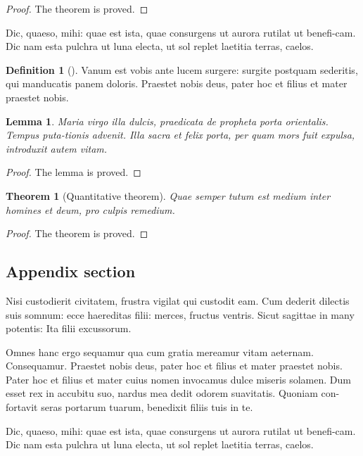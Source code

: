 \documentclass[numbers,compress]{vmsta2}
\newtheorem{thm}{Theorem}
\newtheorem{lemma}{Lemma}
\theoremstyle{definition}
\newtheorem{defin}{Definition}
\begin{document}
\begin{proof}
The theorem is proved.
\end{proof}

Dic, quaeso, mihi: quae est ista, quae consurgens ut aurora rutilat
ut benefi-cam.  Dic nam esta pulchra ut luna electa, ut sol replet
laetitia terras, caelos.

\begin{defin}[\cite{powergrid1}]\label{clas}
Vanum est vobis ante lucem surgere: surgite postquam
sederitis, qui manducatis panem doloris. Praestet nobis deus, pater
hoc et filius et mater praestet nobis.
\end{defin}

\begin{lemma}
Maria virgo illa dulcis, praedicata de
propheta porta orientalis. Tempus puta-tionis advenit. Illa sacra et
felix porta, per quam mors fuit expulsa, introduxit autem vitam.
\end{lemma}

\begin{proof}
The lemma is proved.
\end{proof}

\begin{thm}[Quantitative theorem]
Quae semper tutum est medium inter homines et deum, pro culpis remedium.
\end{thm}

\begin{proof}
The theorem is proved.
\end{proof}


\begin{appendix}

\section{Appendix section}

Nisi custodierit civitatem,
frustra vigilat qui custodit eam. Cum dederit dilectis suis somnum:
ecce haereditas filii: merces, fructus ventris. Sicut sagittae in
many potentis: Ita filii excussorum.

\end{appendix}

\begin{acknowledgement}[title={Acknowledgments}]
Omnes hanc ergo sequamur qua cum gratia mereamur vitam aeternam.
Consequamur. Praestet nobis deus, pater hoc et filius et mater
praestet nobis.  Pater hoc et filius et mater cuius nomen invocamus
dulce miseris solamen. Dum esset rex in accubitu suo, nardus mea
dedit odorem suavitatis. Quoniam con-fortavit seras portarum tuarum,
benedixit filiis tuis in te.
\end{acknowledgement}

\begin{funding}
Dic, quaeso, mihi: quae est ista, quae consurgens ut aurora rutilat
ut benefi-cam.  Dic nam esta pulchra ut luna electa, ut sol replet
laetitia terras, caelos.
\end{funding}



\end{document}
